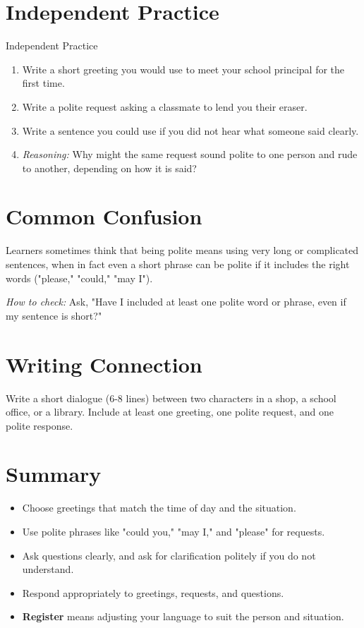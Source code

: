 \section{Independent Practice}
\begin{activitybox}{Independent Practice}
\begin{enumerate}
    \item Write a short greeting you would use to meet your school principal for the first time.
    \item Write a polite request asking a classmate to lend you their eraser.
    \item Write a sentence you could use if you did not hear what someone said clearly.
    \item \textit{Reasoning:} Why might the same request sound polite to one person and rude to another, depending on how it is said?
\end{enumerate}
\end{activitybox}

\section{Common Confusion}
\begin{warningbox}
Learners sometimes think that being polite means using very long or complicated sentences, when in fact even a short phrase can be polite if it includes the right words ("please," "could," "may I").

\textit{How to check:} Ask, "Have I included at least one polite word or phrase, even if my sentence is short?"
\end{warningbox}

\section{Writing Connection}
Write a short dialogue (6-8 lines) between two characters in a shop, a school office, or a library. Include at least one greeting, one polite request, and one polite response.

\section{Summary}
\begin{summarybox}
\begin{itemize}
    \item Choose greetings that match the time of day and the situation.
    \item Use polite phrases like "could you," "may I," and "please" for requests.
    \item Ask questions clearly, and ask for clarification politely if you do not understand.
    \item Respond appropriately to greetings, requests, and questions.
    \item \textbf{Register} means adjusting your language to suit the person and situation.
\end{itemize}
\end{summarybox}

